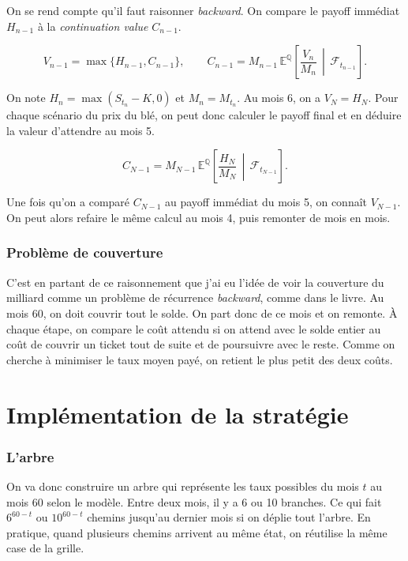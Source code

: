 \documentclass[11pt,a4paper]{article}
\providecommand{\Part}{\part}
\begin{document}
\bigskip

On se rend compte qu'il faut raisonner \emph{backward}. On compare le payoff immédiat $H_{n-1}$ à la \emph{continuation value} $C_{n-1}$.

$$
V_{n-1}=\max\{H_{n-1},C_{n-1}\},
\qquad
C_{n-1}=M_{n-1}\,\mathbb{E}^{\mathbb{Q}}\left[\frac{V_n}{M_n}\,\middle|\,\mathcal{F}_{t_{n-1}}\right].
$$

On note $H_n=\max(S_{t_n}-K,0)$ et $M_n=M_{t_n}$. Au mois 6, on a $V_N=H_N$. Pour chaque scénario du prix du blé, on peut donc calculer le payoff final et en déduire la valeur d'attendre au mois 5.

$$
C_{N-1}=M_{N-1}\,\mathbb{E}^{\mathbb{Q}}\left[\frac{H_N}{M_N}\,\middle|\,\mathcal{F}_{t_{N-1}}\right].
$$

Une fois qu'on a comparé $C_{N-1}$ au payoff immédiat du mois 5, on connaît $V_{N-1}$. On peut alors refaire le même calcul au mois 4, puis remonter de mois en mois.

\section{Problème de couverture}

C'est en partant de ce raisonnement que j'ai eu l'idée de voir la couverture du milliard comme un problème de récurrence \emph{backward}, comme dans le livre. Au mois 60, on doit couvrir tout le solde. On part donc de ce mois et on remonte. À chaque étape, on compare le coût attendu si on attend avec le solde entier au coût de couvrir un ticket tout de suite et de poursuivre avec le reste. Comme on cherche à minimiser le taux moyen payé, on retient le plus petit des deux coûts.







\clearpage
\Part{Implémentation de la stratégie}

\section{L'arbre}

On va donc construire un arbre qui représente les taux possibles du mois $t$ au mois 60 selon le modèle. Entre deux mois, il y a 6 ou 10 branches. Ce qui fait $6^{60-t}$ ou $10^{60-t}$ chemins jusqu'au dernier mois si on déplie tout l'arbre. En pratique, quand plusieurs chemins arrivent au même état, on réutilise la même case de la grille.
\end{document}
